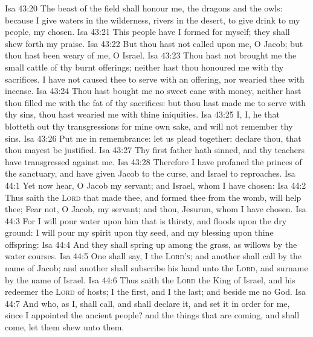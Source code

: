 \vs Isa 43:20 The beast of the field shall honour me, the dragons and the owls: because I give waters in the wilderness,  rivers in the desert, to give drink to my people, my chosen.
\vs Isa 43:21 This people have I formed for myself; they shall shew forth my praise.
\vs Isa 43:22 But thou hast not called upon me, O Jacob; but thou hast been weary of me, O Israel.
\vs Isa 43:23 Thou hast not brought me the small cattle of thy burnt offerings; neither hast thou honoured me with thy sacrifices. I have not caused thee to serve with an offering, nor wearied thee with incense.
\vs Isa 43:24 Thou hast bought me no sweet cane with money, neither hast thou filled me with the fat of thy sacrifices: but thou hast made me to serve with thy sins, thou hast wearied me with thine iniquities.
\vs Isa 43:25 I,  I,  he that blotteth out thy transgressions for mine own sake, and will not remember thy sins.
\vs Isa 43:26 Put me in remembrance: let us plead together: declare thou, that thou mayest be justified.
\vs Isa 43:27 Thy first father hath sinned, and thy teachers have transgressed against me.
\vs Isa 43:28 Therefore I have profaned the princes of the sanctuary, and have given Jacob to the curse, and Israel to reproaches.
\vs Isa 44:1 Yet now hear, O Jacob my servant; and Israel, whom I have chosen:
\vs Isa 44:2 Thus saith the \textsc{Lord} that made thee, and formed thee from the womb,  will help thee; Fear not, O Jacob, my servant; and thou, Jesurun, whom I have chosen.
\vs Isa 44:3 For I will pour water upon him that is thirsty, and floods upon the dry ground: I will pour my spirit upon thy seed, and my blessing upon thine offspring:
\vs Isa 44:4 And they shall spring up  among the grass, as willows by the water courses.
\vs Isa 44:5 One shall say, I  the \textsc{Lord's}; and another shall call  by the name of Jacob; and another shall subscribe  his hand unto the \textsc{Lord}, and surname  by the name of Israel.
\vs Isa 44:6 Thus saith the \textsc{Lord} the King of Israel, and his redeemer the \textsc{Lord} of hosts; I  the first, and I  the last; and beside me  no God.
\vs Isa 44:7 And who, as I, shall call, and shall declare it, and set it in order for me, since I appointed the ancient people? and the things that are coming, and shall come, let them shew unto them.
